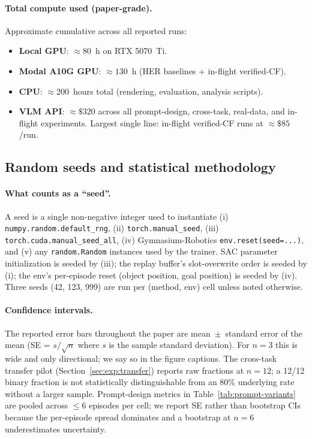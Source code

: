 \paragraph{Total compute used (paper-grade).}
Approximate cumulative across all reported runs:
\begin{itemize}\itemsep0pt
\item \textbf{Local GPU}: $\approx 80$~h on RTX 5070~Ti.
\item \textbf{Modal A10G GPU}: $\approx 130$~h (HER baselines + in-flight verified-CF).
\item \textbf{CPU}: $\approx 200$~hours total (rendering, evaluation, analysis scripts).
\item \textbf{VLM API}: $\approx \$320$ across all prompt-design,
cross-task, real-data, and in-flight experiments. Largest single line:
in-flight verified-CF runs at $\approx \$85$/run.
\end{itemize}

\subsection{Random seeds and statistical methodology}
\label{app:stats}

\paragraph{What counts as a ``seed''.}
A seed is a single non-negative integer used to instantiate (i)
\texttt{numpy.random.default\_rng}, (ii)
\texttt{torch.manual\_seed}, (iii) \texttt{torch.cuda.manual\_seed\_all},
(iv) Gymnasium-Robotics \texttt{env.reset(seed=...)}, and (v) any
\texttt{random.Random} instances used by the trainer. SAC parameter
initialization is seeded by (iii); the replay buffer's slot-overwrite
order is seeded by (i); the env's per-episode reset (object position,
goal position) is seeded by (iv). Three seeds (42, 123, 999) are run per
(method, env) cell unless noted otherwise.

\paragraph{Confidence intervals.}
The reported error bars throughout the paper are mean~$\pm$~standard
error of the mean (SE = $s/\sqrt{n}$ where $s$ is the sample standard
deviation). For $n=3$ this is wide and only directional; we say so in
the figure captions. The cross-task transfer pilot
(Section~\ref{sec:exp:transfer}) reports raw fractions at $n=12$; a
12/12 binary fraction is not statistically distinguishable from an 80\%
underlying rate without a larger sample. Prompt-design metrics in
Table~\ref{tab:prompt-variants} are pooled across $\le\!6$ episodes per
cell; we report SE rather than bootstrap CIs because the per-episode
spread dominates and a bootstrap at $n=6$ underestimates uncertainty.

